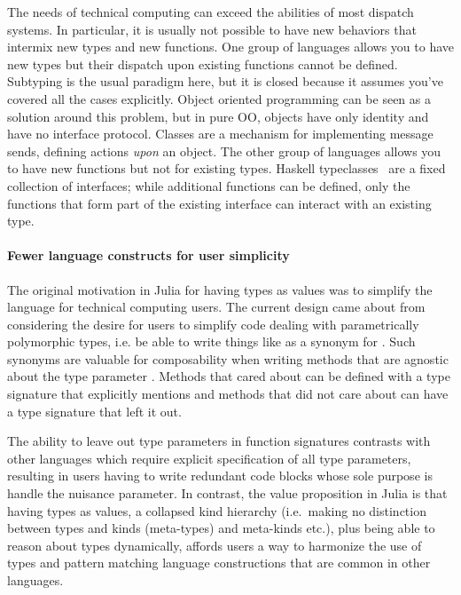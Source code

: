 
The needs of technical computing can exceed the abilities of most dispatch systems. In particular, it is usually not possible to have new behaviors that intermix new types and new functions. One group of languages allows you to have new types but their dispatch upon existing functions cannot be defined. Subtyping is the usual paradigm here, but it is closed because it assumes you've covered all the cases explicitly. Object oriented programming can be seen as a solution around this problem, but in pure OO, objects have only identity and have no interface protocol. Classes are a mechanism for implementing message sends, defining actions \textit{upon} an object. The other group of languages allows you to have new functions but not for existing types. Haskell typeclasses~\cite{typeclass} are a fixed collection of interfaces; while additional functions can be defined, only the functions that form part of the existing interface can interact with an existing type.

\paragraph{Fewer language constructs for user simplicity}

The original motivation in Julia for having types as values was to simplify the
language for technical computing users. The current design came about from
considering the desire for users to simplify code dealing with parametrically
polymorphic types, i.e. be able to write things like  as a synonym
for . Such synonyms are valuable for composability when writing 
methods that are agnostic about the type parameter . Methods that cared
about  can be defined with a type signature that explicitly mentions
 and methods that did not care about  can have a type signature
that left it out.

The ability to leave out type parameters in function signatures contrasts with
other languages which require explicit specification of all type parameters,
resulting in users having to write redundant code blocks whose sole purpose is
handle the nuisance parameter. In contrast, the value proposition in Julia is
that having types as values, a collapsed kind hierarchy (i.e.\ making no
distinction between types and kinds (meta-types) and meta-kinds etc.), plus
being able to reason about types dynamically, affords users a way to harmonize
the use of types and pattern matching language constructions that are common in
other languages.
